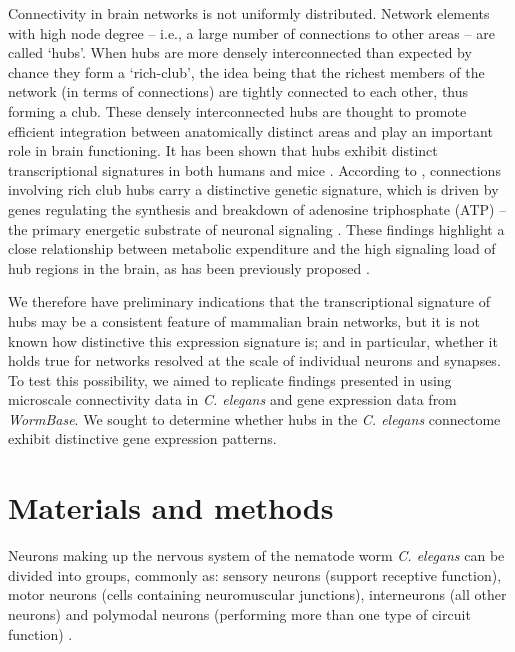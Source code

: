 \documentclass[10pt,letterpaper]{article}
\begin{document}
Connectivity in brain networks is not uniformly distributed. Network elements with high node degree – i.e., a large number of connections to other areas – are called `hubs'.
When hubs are more densely interconnected than expected by chance they form a `rich-club', the idea being that the richest members of the network (in terms of connections) are tightly connected to each other, thus forming a club.
These densely interconnected hubs are thought to promote efficient integration between anatomically distinct areas and play an important role in brain functioning.
It has been shown that hubs exhibit distinct transcriptional signatures in both humans \cite{Vertes2016a} and mice \cite{Fulcher2016}.
According to \citet{Fulcher2016}, connections involving rich club hubs carry a distinctive genetic signature, which is driven by genes regulating the synthesis and breakdown of adenosine triphosphate (ATP) – the primary energetic substrate of neuronal signaling \cite{Fulcher2016}.
These findings highlight a close relationship between metabolic expenditure and the high signaling load of hub regions in the brain, as has been previously proposed \cite{Bullmore2012}.


We therefore have preliminary indications that the transcriptional signature of hubs may be a consistent feature of mammalian brain networks, but it is not known how distinctive this expression signature is; and in particular, whether it holds true for networks resolved at the scale of individual neurons and synapses.
To test this possibility, we aimed to replicate findings presented in \cite{Fulcher2016} using microscale connectivity data in \emph{C. elegans} and gene expression data from \emph{WormBase}.
We sought to determine whether hubs in the \emph{C. elegans} connectome exhibit distinctive gene expression patterns.


\section*{Materials and methods}

Neurons making up the nervous system of the nematode worm \emph{C. elegans} can be divided into groups, commonly as: sensory neurons (support receptive function), motor neurons (cells containing neuromuscular junctions), interneurons (all other neurons) and polymodal neurons (performing more than one type of circuit function) \cite{White:1986tx}.
\end{document}
